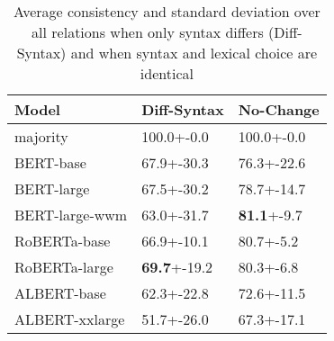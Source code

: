 \begin{table}[t]
    \centering
\begin{tabular}{lll}
\toprule
Model & Diff-Syntax & No-Change \\
\midrule
majority       &            100.0+-0.0 &            100.0+-0.0 \\
\midrule
BERT-base      &            67.9+-30.3 &            76.3+-22.6 \\
BERT-large     &            67.5+-30.2 &            78.7+-14.7 \\
BERT-large-wwm &            63.0+-31.7 &             \textbf{81.1}+-9.7 \\
\midrule
RoBERTa-base   &            66.9+-10.1 &             80.7+-5.2 \\
RoBERTa-large  &            \textbf{69.7}+-19.2 &             80.3+-6.8 \\
\midrule
ALBERT-base    &            62.3+-22.8 &            72.6+-11.5 \\
ALBERT-xxlarge &            51.7+-26.0 &            67.3+-17.1 \\
\bottomrule
\end{tabular}

    \caption{Average consistency and standard deviation over
      all relations when only  syntax differs
      (Diff-Syntax) and when syntax and lexical choice are   identical}
    \label{tab:syntax_results}
\end{table}
